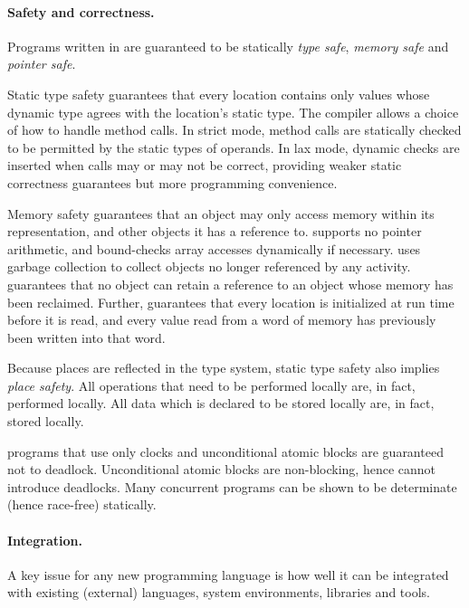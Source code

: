 \paragraph{Safety and correctness.}


Programs written in \Xten{} are guaranteed to be statically
\emph{type safe}, \emph{memory safe} and \emph{pointer safe}. 

Static type safety guarantees that every location contains only values whose
dynamic type agrees with the location's static type. The compiler allows a
choice of how to handle method calls. In strict mode, method calls are
statically checked to be permitted by the static types of operands. In lax
mode, dynamic checks are inserted when calls may or may not be correct,
providing weaker static correctness guarantees but more programming
convenience. 

Memory safety guarantees that an object may only access memory within its
representation, and other objects it has a reference to. \Xten{} supports no
pointer arithmetic, and bound-checks array accesses dynamically if necessary.
\Xten{} uses garbage collection to collect objects no longer referenced by any
activity. \Xten{} guarantees that no object can retain a reference to an
object whose memory has been reclaimed. Further, \Xten{} guarantees that every
location is initialized at run time before it is read, and every value read
from a word of memory has previously been written into that word.


Because places are reflected in the type system, static type safety
also implies \emph{place safety}. All operations that need to be performed
locally are, in fact, performed locally.  All data which is declared to be
stored locally are, in fact, stored locally.

\Xten{} programs that use only clocks and unconditional atomic
blocks are guaranteed not to deadlock. Unconditional atomic blocks
are non-blocking, hence cannot introduce deadlocks.
Many concurrent programs can be shown to be determinate (hence
race-free) statically.

\paragraph{Integration.}
A key issue for any new programming language is how well it can be
integrated with existing (external) languages, system environments,
libraries and tools.

